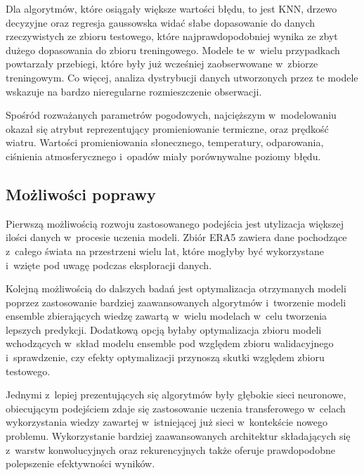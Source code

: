 Dla algorytmów, które osiągały większe wartości błędu, to jest KNN, drzewo decyzyjne
oraz regresja gaussowska widać słabe dopasowanie do danych rzeczywistych ze zbioru 
testowego, które najprawdopodobniej wynika ze zbyt dużego dopasowania do zbioru treningowego.
Modele te w~wielu przypadkach powtarzały przebiegi, które były już wcześniej
zaobserwowane w~zbiorze treningowym. Co więcej, analiza dystrybucji danych utworzonych
przez te modele wskazuje na bardzo nieregularne rozmieszczenie obserwacji.

Spośród rozważanych parametrów pogodowych, najcięższym w~modelowaniu okazał
się atrybut reprezentujący promieniowanie termiczne, oraz prędkość wiatru.
Wartości promieniowania słonecznego, temperatury, odparowania, ciśnienia 
atmosferycznego i~opadów miały porównywalne poziomy błędu.

\subsection{Możliwości poprawy}

Pierwszą możliwością rozwoju zastosowanego podejścia jest utylizacja większej ilości
danych w~procesie uczenia modeli. Zbiór ERA5 zawiera dane pochodzące z~całego świata
na przestrzeni wielu lat, które mogłyby być wykorzystane i~wzięte pod uwagę podczas
eksploracji danych. 

Kolejną możliwością do dalszych badań jest optymalizacja otrzymanych modeli poprzez 
zastosowanie bardziej zaawansowanych algorytmów i~tworzenie modeli ensemble
zbierających wiedzę zawartą w~wielu modelach w~celu tworzenia lepszych 
predykcji. Dodatkową opcją byłaby optymalizacja zbioru modeli wchodzących w~skład
modelu ensemble pod względem zbioru walidacyjnego i~sprawdzenie, czy efekty 
optymalizacji przynoszą skutki względem zbioru testowego.

Jednymi z~lepiej prezentujących się algorytmów były głębokie sieci neuronowe,
obiecującym podejściem zdaje się zastosowanie uczenia transferowego w~celach 
wykorzystania wiedzy zawartej w~istniejącej już sieci w~kontekście nowego problemu.
Wykorzystanie bardziej zaawansowanych architektur składających się z~warstw konwolucyjnych
oraz rekurencyjnych także oferuje prawdopodobne polepszenie efektywności wyników.



